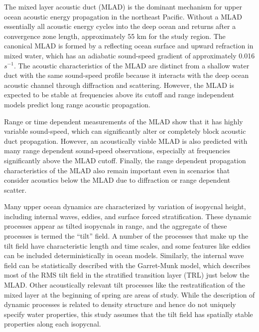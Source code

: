 \documentclass[preprint,NumberedRefs]{JASA}
\begin{document}
The mixed layer acoustic duct (MLAD) is the dominant mechanism for upper ocean acoustic energy propagation in the northeast Pacific. Without a MLAD essentially all acoustic energy cycles into the deep ocean and returns after a convergence zone length,\cite{jensen2011computational} approximately 55 km for the study region. The canonical MLAD is formed by a reflecting ocean surface and upward refraction in mixed water, which has an adiabatic sound-speed gradient of approximately 0.016 $s^{-1}$. The acoustic characteristics of the MLAD are distinct from a shallow water duct with the same sound-speed profile because it interacts with the deep ocean acoustic channel through diffraction\citep{porter93} and scattering.\cite{colosi2020observations} However, the MLAD is expected to be stable at frequencies above its cutoff\citep{Urick1982Prop} and range independent models predict long range acoustic propagation.

Range or time dependent measurements of the MLAD show that it has highly variable sound-speed,\citep{cole2010seasonal,rudnick1999compensation,klymak2015} which can significantly alter or completely block acoustic duct propagation.\citep{colosi2020observations,colosi21} However, an acoustically viable MLAD is also predicted with many range dependent sound-speed observations, especially at frequencies significantly above the MLAD cutoff. Finally, the range dependent propagation characteristics of the MLAD also remain important even in scenarios that consider acoustics below the MLAD due to diffraction or range dependent scatter.\citep{colosi21}

Many upper ocean dynamics are characterized by variation of isopycnal height, including internal waves, eddies, and surface forced stratification. These dynamic processes appear as tilted isopycnals in range, and the aggregate of these processes is termed the ``tilt'' field.\cite{dzieciuch2004} A number of the processes that make up the tilt field have characteristic length and time scales, and some features like eddies can be included deterministically in ocean models. Similarly, the internal wave field can be statistically described with the Garret-Munk model,\cite{garrett1972space} which describes most of the RMS tilt field in the stratified transition layer (TRL) just below the MLAD. Other acoustically relevant tilt processes like the restratification of the mixed layer at the beginning of spring are areas of study.\cite{cole2010seasonal} While the description of dynamic processes is related to density structure and hence do not uniquely specify water properties, this study assumes that the tilt field has spatially stable properties along each isopycnal.
\end{document}
